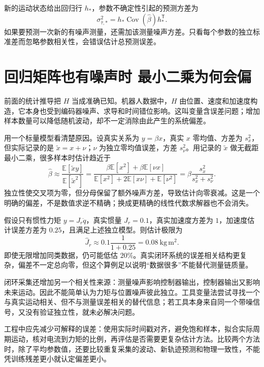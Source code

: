 新的运动状态给出回归行 $h_*$，参数不确定性引起的预测方差为
\begin{equation}
 \sigma_{\hat\tau,*}^2=h_*\operatorname{Cov}(\hat\beta)h_*^{\mathsf T}.
\end{equation}
如果要预测一次新的有噪声测量，还需加该测量噪声方差。只看每个参数的独立标准差而忽略参数相关性，会错误估计总预测误差。

\section{回归矩阵也有噪声时 最小二乘为何会偏}
前面的统计推导把 $H$ 当成准确已知。机器人数据中，$H$ 由位置、速度和加速度构造，它本身也受到编码器噪声、求导和时间错位影响。这叫变量含误差问题；增加样本数量可以降低随机波动，却不一定消除由此产生的系统偏差。

用一个标量模型看清楚原因。设真实关系为 $y=\beta x$，真实 $x$ 零均值、方差为 $s_x^2$，但实际记录的是 $\tilde x=x+\nu$；$\nu$ 为独立零均值误差，方差 $s_\nu^2$。用记录的 $\tilde x$ 做无截距最小二乘，很多样本时估计趋近于
\begin{equation}
 \hat\beta\approx\frac{\mathbb E[\tilde xy]}{\mathbb E[\tilde x^2]}
 =\frac{\beta\mathbb E[x^2]+\beta\mathbb E[\nu x]}{\mathbb E[x^2]+2\mathbb E[x\nu]+\mathbb E[\nu^2]}
 =\beta\frac{s_x^2}{s_x^2+s_\nu^2}.
\end{equation}
独立性使交叉项为零，但分母保留了额外噪声方差，导致估计向零衰减。这是一个明确的偏差，不是数值求逆不精确；换成更精确的线性代数求解器也不会消失。

\begin{examplebox}[算例 8F 加速度噪声可能把惯量估低]
假设只有惯性力矩 $y=J_r\ddot q$，真实惯量 $J_r=0.1$，真实加速度方差为 $1$，加速度估计误差方差为 $0.25$，且满足上述独立模型。则估计极限为
\[
 \hat J_r\approx0.1\frac1{1+0.25}=0.08\ \mathrm{kg\,m^2}.
\]
即使无限增加同类数据，仍可能低估 $20\%$。真实闭环系统的误差相关结构更复杂，偏差不一定总向零，但这个算例足以说明“数据很多”不能替代测量链质量。
\end{examplebox}

闭环采集还增加另一个相关性来源：测量噪声影响控制器输出，控制器输出又影响未来运动。因此不能简单认为力矩与位置噪声彼此独立。工具变量法尝试寻找一个与真实运动相关、但不与测量误差相关的替代信息；若工具本身来自同一个带噪信号，又没有验证独立性，就未必解决问题。

工程中应先减少可解释的误差：使用实际时间戳对齐，避免饱和样本，拟合实际周期运动，核对电流到力矩的比例，再评估是否需要更复杂估计方法。比较两个方法时，除了平均参数值，还要比较重复采集的波动、新轨迹预测和物理一致性，不能凭训练残差更小就认定偏差更小。

